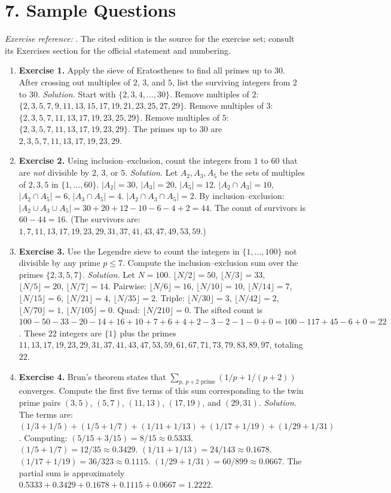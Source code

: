 \section*{7. Sample Questions}
\emph{Exercise reference:} \cite{sieve_ref1}. The cited edition is the source for the exercise set; consult its Exercises section for the official statement and numbering.
\begin{enumerate}[leftmargin=*,itemsep=0.9em]
\item \textbf{Exercise 1.} Apply the sieve of Eratosthenes to find all primes up to $30$. After crossing out multiples of $2$, $3$, and $5$, list the surviving integers from $2$ to $30$. \emph{Solution.} Start with $\{2,3,4,\ldots,30\}$. Remove multiples of $2$: $\{2,3,5,7,9,11,13,15,17,19,21,23,25,27,29\}$. Remove multiples of $3$: $\{2,3,5,7,11,13,17,19,23,25,29\}$. Remove multiples of $5$: $\{2,3,5,7,11,13,17,19,23,29\}$. The primes up to $30$ are $2,3,5,7,11,13,17,19,23,29$.

\item \textbf{Exercise 2.} Using inclusion--exclusion, count the integers from $1$ to $60$ that are \emph{not} divisible by $2$, $3$, or $5$. \emph{Solution.} Let $A_2,A_3,A_5$ be the sets of multiples of $2,3,5$ in $\{1,\ldots,60\}$. $|A_2|=30$, $|A_3|=20$, $|A_5|=12$. $|A_2\cap A_3|=10$, $|A_2\cap A_5|=6$, $|A_3\cap A_5|=4$. $|A_2\cap A_3\cap A_5|=2$. By inclusion--exclusion: $|A_2\cup A_3\cup A_5|=30+20+12-10-6-4+2=44$. The count of survivors is $60-44=16$. (The survivors are: $1,7,11,13,17,19,23,29,31,37,41,43,47,49,53,59$.)

\item \textbf{Exercise 3.} Use the Legendre sieve to count the integers in $\{1,\ldots,100\}$ not divisible by any prime $p\leq 7$. Compute the inclusion--exclusion sum over the primes $\{2,3,5,7\}$. \emph{Solution.} Let $N=100$. $\lfloor N/2\rfloor=50$, $\lfloor N/3\rfloor=33$, $\lfloor N/5\rfloor=20$, $\lfloor N/7\rfloor=14$. Pairwise: $\lfloor N/6\rfloor=16$, $\lfloor N/10\rfloor=10$, $\lfloor N/14\rfloor=7$, $\lfloor N/15\rfloor=6$, $\lfloor N/21\rfloor=4$, $\lfloor N/35\rfloor=2$. Triple: $\lfloor N/30\rfloor=3$, $\lfloor N/42\rfloor=2$, $\lfloor N/70\rfloor=1$, $\lfloor N/105\rfloor=0$. Quad: $\lfloor N/210\rfloor=0$. The sifted count is $100-50-33-20-14+16+10+7+6+4+2-3-2-1-0+0=100-117+45-6+0=22$. These $22$ integers are $\{1\}$ plus the primes $11,13,17,19,23,29,31,37,41,43,47,53,59,61,67,71,73,79,83,89,97$, totaling $22$.

\item \textbf{Exercise 4.} Brun's theorem states that $\sum_{p,\,p+2\text{ prime}}(1/p+1/(p+2))$ converges. Compute the first five terms of this sum corresponding to the twin prime pairs $(3,5)$, $(5,7)$, $(11,13)$, $(17,19)$, and $(29,31)$. \emph{Solution.} The terms are: $(1/3+1/5)+(1/5+1/7)+(1/11+1/13)+(1/17+1/19)+(1/29+1/31)$. Computing: $(5/15+3/15)=8/15\approx 0.5333$. $(1/5+1/7)=12/35\approx 0.3429$. $(1/11+1/13)=24/143\approx 0.1678$. $(1/17+1/19)=36/323\approx 0.1115$. $(1/29+1/31)=60/899\approx 0.0667$. The partial sum is approximately $0.5333+0.3429+0.1678+0.1115+0.0667=1.2222$.


\end{enumerate}
